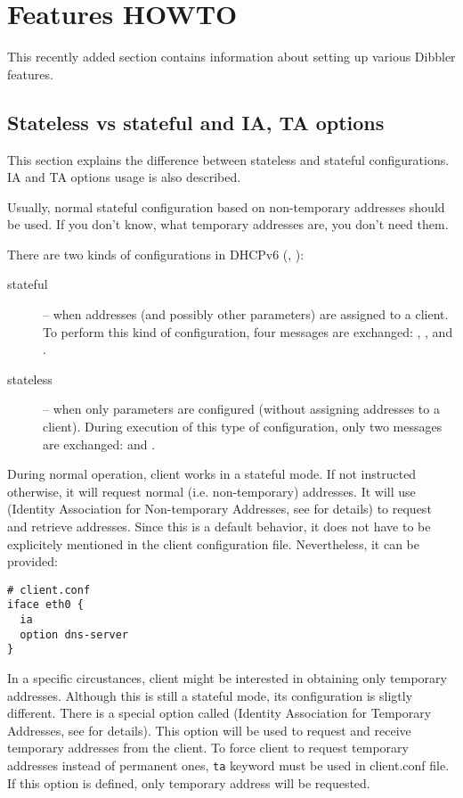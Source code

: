 \section{Features HOWTO}
This recently added section contains information about setting up
various Dibbler features.

\subsection{Stateless vs stateful and IA, TA options}
\label{features-stateless-stateful}
This section explains the difference between stateless and stateful
configurations. IA and TA options usage is also described.

\Note Usually, normal stateful configuration based on non-temporary
addresses should be used. If you don't know, what temporary addresses
are, you don't need them.

There are two kinds of configurations in DHCPv6 (\cite{rfc3315}, \cite{rfc3736}):
\begin{description}
  \item[stateful] -- when addresses (and possibly other parameters)
    are assigned to a client. To perform this kind of configuration,
    four messages are exchanged: , ,
     and .
  \item[stateless] -- when only parameters are configured (without
    assigning addresses to a client). During execution of this type of
    configuration, only two messages are exchanged: 
    and .
\end{description}

During normal operation, client works in a stateful mode. If not
instructed otherwise, it will request normal (i.e. non-temporary)
addresses. It will use  (Identity Association for
Non-temporary Addresses, see \cite{rfc3315} for details) to request
and retrieve addresses. Since this is a default behavior, it does not
have to be explicitely mentioned in the client configuration
file. Nevertheless, it can be provided:

\begin{Verbatim}
# client.conf
iface eth0 {
  ia
  option dns-server
}
\end{Verbatim}

In a specific circustances, client might be interested in obtaining
only temporary addresses. Although this is still a stateful mode, its
configuration is sligtly different. There is a special option called 
(Identity Association for Temporary Addresses, see \cite{rfc3315} for
details). This option will be used to request and receive temporary
addresses from the client. To force client to request temporary
addresses instead of permanent ones, \verb+ta+ keyword must be used in
client.conf file. If this option is defined, only temporary address
will be requested.

